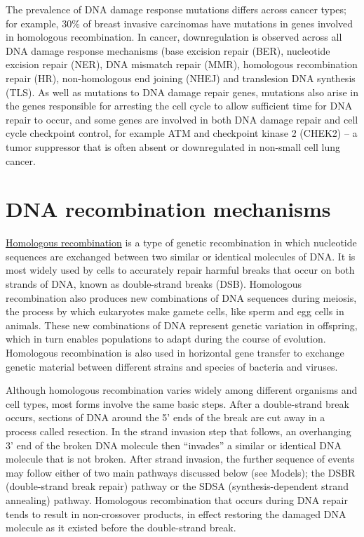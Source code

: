 The prevalence of DNA damage response mutations differs across cancer types; for example, 30\% of breast invasive carcinomas have mutations in genes involved in homologous recombination. In cancer, downregulation is observed across all DNA damage response mechanisms (base excision repair (BER), nucleotide excision repair (NER), DNA mismatch repair (MMR), homologous recombination repair (HR), non-homologous end joining (NHEJ) and translesion DNA synthesis (TLS). As well as mutations to DNA damage repair genes, mutations also arise in the genes responsible for arresting the cell cycle to allow sufficient time for DNA repair to occur, and some genes are involved in both DNA damage repair and cell cycle checkpoint control, for example ATM and checkpoint kinase 2 (CHEK2) -- a tumor suppressor that is often absent or downregulated in non-small cell lung cancer.

\hypertarget{dna-recombination-mechanisms}{%
\section{DNA recombination mechanisms}\label{dna-recombination-mechanisms}}

\href{https://en.wikipedia.org/wiki/Homologous_recombination}{Homologous recombination} is a type of genetic recombination in which nucleotide sequences are exchanged between two similar or identical molecules of DNA. It is most widely used by cells to accurately repair harmful breaks that occur on both strands of DNA, known as double-strand breaks (DSB). Homologous recombination also produces new combinations of DNA sequences during meiosis, the process by which eukaryotes make gamete cells, like sperm and egg cells in animals. These new combinations of DNA represent genetic variation in offspring, which in turn enables populations to adapt during the course of evolution. Homologous recombination is also used in horizontal gene transfer to exchange genetic material between different strains and species of bacteria and viruses.

Although homologous recombination varies widely among different organisms and cell types, most forms involve the same basic steps. After a double-strand break occurs, sections of DNA around the 5' ends of the break are cut away in a process called resection. In the strand invasion step that follows, an overhanging 3' end of the broken DNA molecule then ``invades'' a similar or identical DNA molecule that is not broken. After strand invasion, the further sequence of events may follow either of two main pathways discussed below (see Models); the DSBR (double-strand break repair) pathway or the SDSA (synthesis-dependent strand annealing) pathway. Homologous recombination that occurs during DNA repair tends to result in non-crossover products, in effect restoring the damaged DNA molecule as it existed before the double-strand break.

